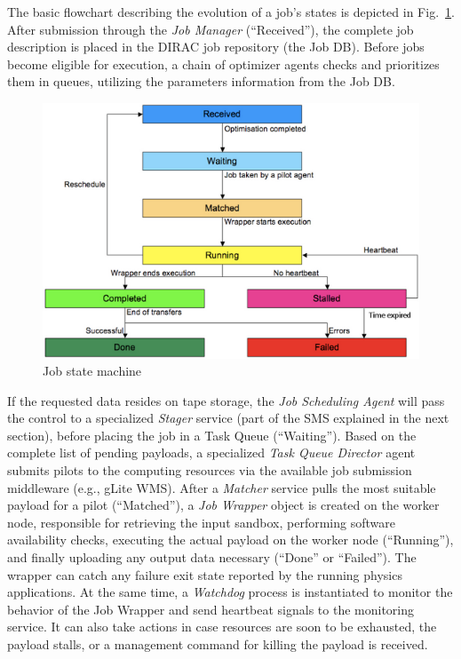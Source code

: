 \documentclass[sort&compress,preprint,3p]{elsarticle}
\begin{document}
The basic flowchart describing the evolution of a job's states is depicted in
Fig.~\ref{fig:DIRAC-job-state-machine}. After submission through the \textit{Job Manager} (``Received''), the complete
job description is placed in the DIRAC job repository (the Job DB). Before jobs
become eligible for execution, a chain of optimizer agents checks and prioritizes
them in queues, utilizing the parameters information from the Job DB.
\begin{figure}[tp]
\includegraphics[width=0.7\linewidth,keepaspectratio=true]{./graphics/Figure3.png}
\centering
\caption{Job state machine \cite{ProductionShifterGuide}}
\label{fig:DIRAC-job-state-machine}
\end{figure} 
If the requested data resides on tape storage, the \textit{Job
Scheduling Agent} will pass the control to a specialized \textit{Stager} service (part of
the SMS explained in the next section), before placing the job in a Task Queue
(``Waiting''). Based on the complete list of pending payloads, a specialized \textit{Task
Queue Director} agent submits pilots to the computing resources via the available job
submission middleware (e.g., gLite WMS). After
a \textit{Matcher} service pulls the most suitable payload for a pilot (``Matched''), a \textit{Job
Wrapper} object is created on the worker node, responsible for retrieving the
input sandbox, performing software availability checks, executing the actual
payload on the worker node (``Running''), and finally uploading any output data
necessary (``Done'' or ``Failed''). The wrapper can catch any failure exit state
reported by the running physics applications. At the same time, a \textit{Watchdog}
process is instantiated to monitor the behavior of the Job Wrapper and send
heartbeat signals to the monitoring service. It can also take actions in case
resources are soon to be exhausted, the payload stalls, or a management command
for killing the payload is received.
\end{document}
